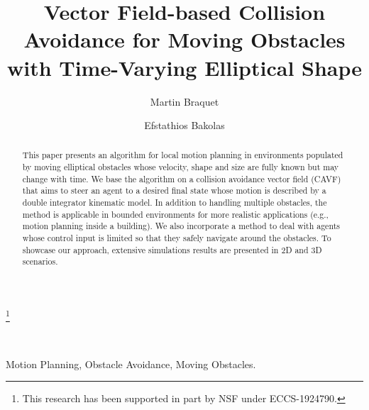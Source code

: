 


\begin{frontmatter}

\title{Vector Field-based Collision Avoidance for Moving Obstacles with Time-Varying Elliptical Shape }

\thanks[footnoteinfo]{This research has been supported in part by NSF under ECCS-1924790. }

\author[First]{Martin Braquet}~~~~ 
\author[First]{Efstathios Bakolas} 

\address[First]{Department of Aerospace Engineering and Engineering Mechanics, The University of Texas at Austin, Austin, Texas 78712-1221, USA (e-mail: braquet@utexas.edu, bakolas@austin.utexas.edu).}

\begin{abstract}
This paper presents an algorithm for local motion planning in environments populated by moving elliptical obstacles whose velocity, shape and size are fully known but may change with time. We base the algorithm on a collision avoidance vector field (CAVF) that aims to steer an agent to a desired final state whose motion is described by a double integrator kinematic model. In addition to handling multiple obstacles, the method is applicable in bounded environments for more realistic applications (e.g., motion planning inside a building). We also incorporate a method to deal with agents whose control input is limited so that they safely navigate around the obstacles. To showcase our approach, extensive simulations results are presented in 2D and 3D scenarios.
\end{abstract}

\begin{keyword}
Motion Planning, Obstacle Avoidance, Moving Obstacles.
\end{keyword}

\end{frontmatter}

\maketitle






